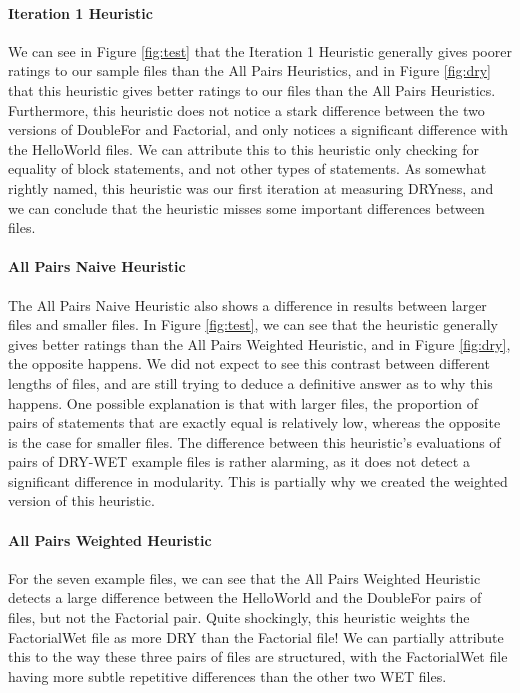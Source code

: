 \documentclass{article}
\begin{document}
\paragraph{Iteration 1 Heuristic}
We can see in Figure \ref{fig:test} that the Iteration 1 Heuristic generally gives poorer ratings to our sample files than the All Pairs Heuristics, and in Figure \ref{fig:dry} that this heuristic gives better ratings to our files than the All Pairs Heuristics. Furthermore, this heuristic
does not notice a stark difference between the two versions of DoubleFor and Factorial, and only notices a significant difference with the HelloWorld files. We can attribute this to this heuristic only checking for equality of block statements, and not other types of statements.
As somewhat rightly named, this heuristic was our first iteration at measuring DRYness, and we can conclude that the heuristic misses
some important differences between files.

\paragraph{All Pairs Naive Heuristic}
The All Pairs Naive Heuristic also shows a difference in results between larger files and smaller files. In Figure \ref{fig:test}, we
can see that the heuristic generally gives better ratings than the All Pairs Weighted Heuristic, and in Figure \ref{fig:dry}, the opposite happens. We did not expect to see this contrast between different lengths of files, and are still trying to deduce a definitive answer as to why this happens. One possible explanation is that with larger files, the proportion of pairs of statements that are exactly
equal is relatively low, whereas the opposite is the case for smaller files. The difference between this heuristic's evaluations of pairs of DRY-WET example files is rather alarming, as it does not detect a significant difference in modularity. This is partially why we
created the weighted version of this heuristic.

\paragraph{All Pairs Weighted Heuristic}
For the seven example files, we can see that the All Pairs Weighted Heuristic detects a large difference between the HelloWorld and the DoubleFor pairs of files, but not the Factorial pair. Quite shockingly, this heuristic weights the FactorialWet file as more DRY than the Factorial file! We can partially attribute this to the way these three pairs of files are structured, with the FactorialWet file having more subtle repetitive differences than the other two WET files.
\end{document}
